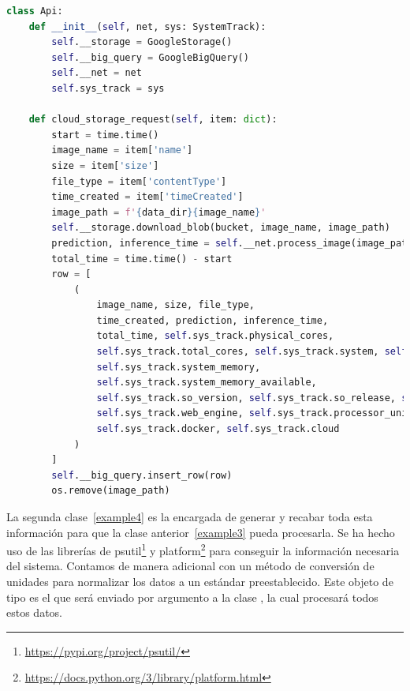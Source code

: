 \begin{lstlisting}[caption=Clase Python para la API de la aplicación.,
      label=c_label,
      language=Python,label={example3}]
    class Api:
    def __init__(self, net, sys: SystemTrack):
        self.__storage = GoogleStorage()
        self.__big_query = GoogleBigQuery()
        self.__net = net
        self.sys_track = sys

    def cloud_storage_request(self, item: dict):
        start = time.time()
        image_name = item['name']
        size = item['size']
        file_type = item['contentType']
        time_created = item['timeCreated']
        image_path = f'{data_dir}{image_name}'
        self.__storage.download_blob(bucket, image_name, image_path)
        prediction, inference_time = self.__net.process_image(image_path)
        total_time = time.time() - start
        row = [
            (
                image_name, size, file_type,
                time_created, prediction, inference_time,
                total_time, self.sys_track.physical_cores,
                self.sys_track.total_cores, self.sys_track.system, self.sys_track.processor,
                self.sys_track.system_memory,
                self.sys_track.system_memory_available,
                self.sys_track.so_version, self.sys_track.so_release, self.sys_track.inference_engine,
                self.sys_track.web_engine, self.sys_track.processor_unit,
                self.sys_track.docker, self.sys_track.cloud
            )
        ]
        self.__big_query.insert_row(row)
        os.remove(image_path)
\end{lstlisting}
La segunda clase~\ref{example4} es la encargada de generar y recabar toda esta información para que la clase anterior~\ref{example3} pueda procesarla.
Se ha hecho uso de las librerías de psutil\footnote{\url{https://pypi.org/project/psutil/}} y platform\footnote{\url{https://docs.python.org/3/library/platform.html}} para conseguir la información necesaria del sistema.
Contamos de manera adicional con un método de conversión de unidades para normalizar los datos a un estándar preestablecido.
Este objeto de tipo  es el que será enviado por argumento a la clase , la cual procesará todos estos datos.
